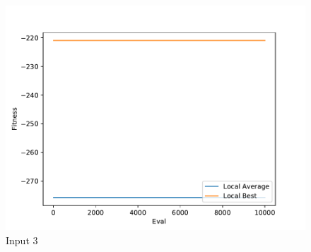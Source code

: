 \documentclass{standalone}
\begin{document}
\begin{figure}[!htb]
	\caption{Input 3}
	\label{fig:graph_3007}
	\includegraphics[width=\textwidth]{../graphs/graphs/3007.pdf}
\end{figure}
\end{document}
